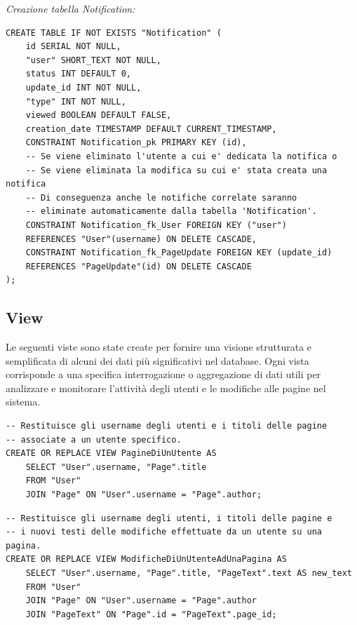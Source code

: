 \documentclass{article}
\begin{document}
	\textit{Creazione tabella Notification:}
	\begin{lstlisting}[style=SQL]
CREATE TABLE IF NOT EXISTS "Notification" (
	id SERIAL NOT NULL,
	"user" SHORT_TEXT NOT NULL,
	status INT DEFAULT 0,
	update_id INT NOT NULL,
	"type" INT NOT NULL,
	viewed BOOLEAN DEFAULT FALSE,
	creation_date TIMESTAMP DEFAULT CURRENT_TIMESTAMP,
	CONSTRAINT Notification_pk PRIMARY KEY (id),
	-- Se viene eliminato l'utente a cui e' dedicata la notifica o 
	-- Se viene eliminata la modifica su cui e' stata creata una notifica
	-- Di conseguenza anche le notifiche correlate saranno 
	-- eliminate automaticamente dalla tabella 'Notification'.	
	CONSTRAINT Notification_fk_User FOREIGN KEY ("user")
	REFERENCES "User"(username) ON DELETE CASCADE,
	CONSTRAINT Notification_fk_PageUpdate FOREIGN KEY (update_id) 
	REFERENCES "PageUpdate"(id) ON DELETE CASCADE
);
	\end{lstlisting}
	
	\newpage
	
	\subsection{View}
	
	Le seguenti viste sono state create per fornire una visione strutturata e semplificata di alcuni dei dati pi\`u significativi nel database. Ogni vista corrisponde a una specifica interrogazione o aggregazione di dati utili per analizzare e monitorare l'attività degli utenti e le modifiche alle pagine nel sistema.
	
\begin{lstlisting}[caption={Vista PagineDiUnUtente}, label={lst:pagine_di_un_utente}, style=SQL]
-- Restituisce gli username degli utenti e i titoli delle pagine 
-- associate a un utente specifico.
CREATE OR REPLACE VIEW PagineDiUnUtente AS
	SELECT "User".username, "Page".title
	FROM "User"
	JOIN "Page" ON "User".username = "Page".author;
\end{lstlisting}

\begin{lstlisting}[caption={Vista ModificheDiUnUtenteAdUnaPagina}, label={lst:modifiche_di_un_utente_ad_una_pagina}, style=SQL]
-- Restituisce gli username degli utenti, i titoli delle pagine e 
-- i nuovi testi delle modifiche effettuate da un utente su una pagina.
CREATE OR REPLACE VIEW ModificheDiUnUtenteAdUnaPagina AS
	SELECT "User".username, "Page".title, "PageText".text AS new_text
	FROM "User"
	JOIN "Page" ON "User".username = "Page".author
	JOIN "PageText" ON "Page".id = "PageText".page_id;
\end{lstlisting}
\end{document}
